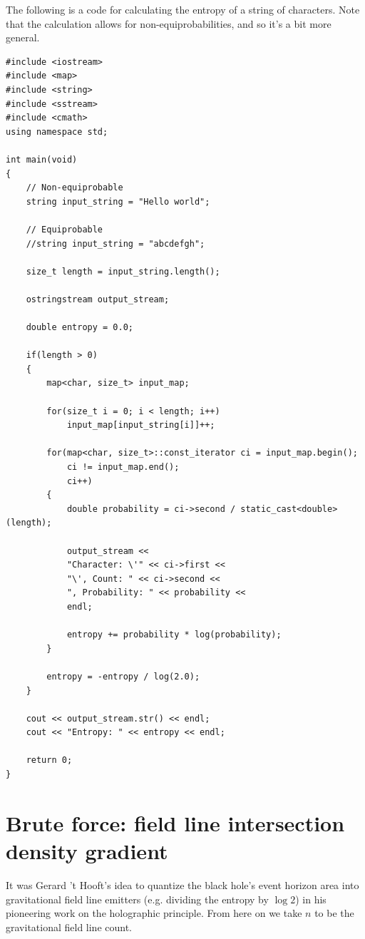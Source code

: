 \documentclass[12pt]{article}
\begin{document}
The following is a code for calculating the entropy of a string of characters.
Note that the calculation allows for non-equiprobabilities, and so it's a bit more general.
\begin{lstlisting}
#include <iostream>
#include <map>
#include <string>
#include <sstream>
#include <cmath>
using namespace std;

int main(void)
{
    // Non-equiprobable
    string input_string = "Hello world";

    // Equiprobable
    //string input_string = "abcdefgh";

    size_t length = input_string.length();

    ostringstream output_stream;
    
    double entropy = 0.0;
    
    if(length > 0)
    {
        map<char, size_t> input_map;

        for(size_t i = 0; i < length; i++)
            input_map[input_string[i]]++;
        
        for(map<char, size_t>::const_iterator ci = input_map.begin(); 
			ci != input_map.end(); 
			ci++)
        {
            double probability = ci->second / static_cast<double>(length);
            
            output_stream << 
			"Character: \'" << ci->first << 
			"\', Count: " << ci->second << 
			", Probability: " << probability << 
			endl;
            
            entropy += probability * log(probability);
        }
        
        entropy = -entropy / log(2.0);
    }

    cout << output_stream.str() << endl;
    cout << "Entropy: " << entropy << endl;
    
    return 0;
}

\end{lstlisting}




\section{Brute force: field line intersection density gradient}

It was Gerard 't Hooft's idea to quantize the black hole's event horizon area into gravitational field line emitters (e.g. dividing the entropy by $\log 2$) in his pioneering work on the holographic principle.
From here on we take $n$ to be the gravitational field line count.
\end{document}
